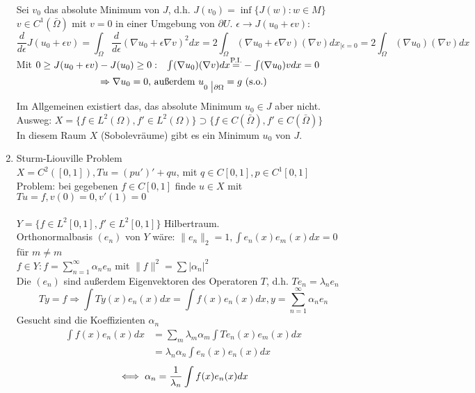 \begin{enumerate}
	Sei $v_{0}$ das absolute Minimum von $J$, d.h. $J(v_{0}) = \inf \{ J(w): w \in M \}$ \\
	$v \in C^{1}(\bar \Omega)$ mit $v = 0$ in einer Umgebung von $\partial U$. $\epsilon \rightarrow J(u_{0} + \epsilon v)$:
	\[ \frac{d}{d\epsilon} J(u_{0} + \epsilon v) = \int_{\Omega} \frac{d}{d\epsilon} (\nabla u_{0} + \epsilon \nabla v)^{2} dx = 2 \int_{\Omega} (\nabla u_{0} + \epsilon \nabla v)(\nabla v) dx_{\big| \epsilon = 0} = 2 \int_\Omega (\nabla u_{0}) (\nabla v) dx \]
	Mit $0 \geq J(u_{0} + \epsilon v)- J(u_{0}) \geq 0: \hspace{0.25cm} \int (\nabla u_{0})(\nabla v) dx \overset{\text{P.I.}}{{=}} - \int (\nabla u_{0})v dx = 0$ \\
	\[ \Rightarrow \nabla u_{0} = 0 \text{, au{\ss}erdem } u_{0 \hspace{0.1cm} \big| \partial \Omega} = g \text{ (s.o.)} \]
	Im Allgemeinen existiert das, das absolute Minimum $u_{0} \in J$ aber nicht. \\
	Ausweg: $X = \{ f \in L^{2}(\Omega), f' \in L^{2}(\Omega) \} \supset \{f \in C(\bar \Omega), f' \in C(\bar \Omega) \} $	\\
	In diesem Raum $X$ (Sobolevräume) gibt es ein Minimum $u_{0}$ von $J$. \\
	\item Sturm-Liouville Problem  \\
	$X = C^{2}([0, 1]), Tu = (pu')' + qu$, mit $q \in C[0, 1], p \in C^{1}[0, 1]$ \\ 
	Problem: bei gegebenen $f \in C[0, 1]$ finde $u \in X$ mit $Tu = f, v(0) = 0, v'(1) = 0$ \\ \\
	$Y = \{ f \in L^{2}[0, 1], f' \in L^{2}[0, 1] \}$ Hilbertraum. \\
	Orthonormalbasis $(e_{n})$ von $Y$ wäre: $\| e_{n} \|_{2} = 1, \int e_{n}(x) e_{m}(x) dx = 0$ für $m \neq m$ \\
	$f \in Y: f = \sum_{n = 1}^{\infty} \alpha_{n} e_{n}$ mit $\| f \|^2 = \sum | \alpha_{n} |^2$ \\
	Die $(e_{n})$ sind au{\ss}erdem Eigenvektoren des Operatoren $T$, d.h. $Te_{n} = \lambda_{n} e_{n}$ \\
	\[ Ty = f \Rightarrow \int Ty(x) e_{n}(x) dx = \int f(x) e_{n}(x) dx, y = \sum_{n = 1}^{\infty} \alpha_{n} e_{n} \]
	Gesucht sind die Koeffizienten $\alpha_{n}$
	\begin{align*}
		\int f(x) e_{n}(x) dx & = \sum_{m} \lambda_{m} \alpha_{m} \int T e_{n}(x) e_{m}(x) dx \\
							  & =  \lambda_{n} \alpha_{n} \int e_{n}(x) e_{n}(x) dx
	\end{align*}
	\[ \iff \alpha_{n} = \frac{1}{\lambda_n} \int f(x) e_{n}(x) dx \]
\end{enumerate}



\newpage